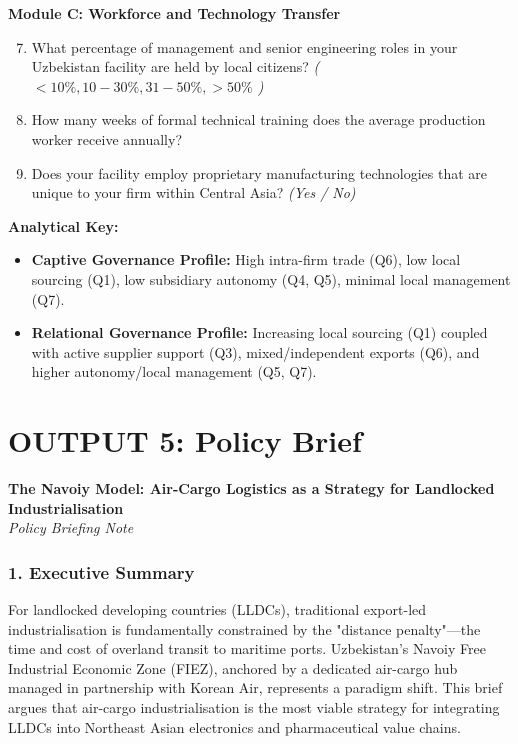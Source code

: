 \documentclass[11pt,a4paper]{article}
\begin{document}
\textbf{Module C: Workforce and Technology Transfer}
\begin{enumerate}
  \setcounter{enumi}{6}
    \item What percentage of management and senior engineering roles in your Uzbekistan facility are held by local citizens? \textit{( $<10\%, 10-30\%, 31-50\%, >50\%$ )}
    \item How many weeks of formal technical training does the average production worker receive annually?
    \item Does your facility employ proprietary manufacturing technologies that are unique to your firm within Central Asia? \textit{(Yes / No)}
\end{enumerate}

\textbf{Analytical Key:}
\begin{itemize}
    \item \textbf{Captive Governance Profile:} High intra-firm trade (Q6), low local sourcing (Q1), low subsidiary autonomy (Q4, Q5), minimal local management (Q7).
    \item \textbf{Relational Governance Profile:} Increasing local sourcing (Q1) coupled with active supplier support (Q3), mixed/independent exports (Q6), and higher autonomy/local management (Q5, Q7).
\end{itemize}

\newpage
\section{OUTPUT 5: Policy Brief}

\begin{center}
    {\Large\color{adbblue}\textbf{The Navoiy Model: Air-Cargo Logistics as a Strategy for Landlocked Industrialisation}}\\[1em]
    \textit{Policy Briefing Note}
\end{center}
\vspace{1em}

\subsubsection*{1. Executive Summary}
For landlocked developing countries (LLDCs), traditional export-led industrialisation is fundamentally constrained by the "distance penalty"—the time and cost of overland transit to maritime ports. Uzbekistan’s Navoiy Free Industrial Economic Zone (FIEZ), anchored by a dedicated air-cargo hub managed in partnership with Korean Air, represents a paradigm shift. This brief argues that air-cargo industrialisation is the most viable strategy for integrating LLDCs into Northeast Asian electronics and pharmaceutical value chains.
\end{document}
